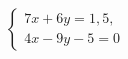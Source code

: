\begin{ex}
	\begin{condition}
		\( \left\{
		\begin{array}{l}
			7x+6y=1,5,\\
			4x-9y-5=0
		\end{array}
		\right. \)
	\end{condition}
\end{ex}